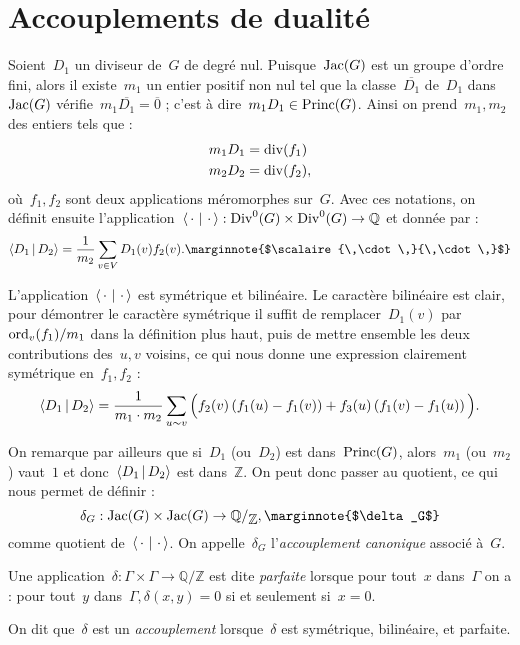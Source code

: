 \section{Accouplements de dualité}
	Soient~$D_1$ un diviseur de~$G$ de degré nul. Puisque~$\operatorname{Jac}(G)$ est un groupe d'ordre fini, alors il existe~$m_1$ un entier positif non nul tel que la classe~$\overline{D_1}$ de~$D_1$ dans~$\operatorname{Jac}(G)$ vérifie~$m_1 \overline{D_1}=\overline{0}$ ; c'est à dire~$m_1 D_1 \in \operatorname{Princ}(G)$. Ainsi on prend~$m_1, m_2$ des entiers tels que :
	\begin{align*}
		m_1 D_1 &= \operatorname{div}(f_1)\\
		m_2 D_2 &= \operatorname{div}(f_2),
	\end{align*}
	où~$f_1, f_2$ sont deux applications méromorphes sur~$G$. Avec ces notations, on définit ensuite l'application~$\left<\,\cdot\,\,|\,\,\cdot\,\right> :\operatorname{Div}^0(G)\times\operatorname{Div}^0(G) \rightarrow \mathbb{Q}$ et donnée par :
	\[
		\scalaire{D_1}{D_2} = \frac{1}{m_2} \sum_{v\in V}D_1(v) f_2(v).	\text{\marginnote{$\scalaire{\,\cdot\,}{\,\cdot\,}$}}
	\]
	\begin{rem}
		L'application~$\left<\,\cdot\,\,|\,\,\cdot\,\right>$ est symétrique et bilinéaire. Le caractère bilinéaire est clair, pour démontrer le caractère symétrique il suffit de remplacer~$D_1(v)$ par~$\operatorname{ord}_v(f_1)/m_1$ dans la définition plus haut, puis de mettre ensemble les deux contributions des~$u,v$ voisins, ce qui nous donne une expression clairement symétrique en~$f_1,f_2$ :
		\[
			\left<D_1\,|\,D_2\right> = \frac{1}{m_1 \cdot m_2}
			\sum_{u \sim v}\Big(
				f_2(v)\left(f_1(u) - f_1(v)\right)
				+
				f_3(u)\left(f_1(v)-f_1(u)\right)
			\Big).
		\]
	\end{rem}
	\begin{rem}
		On remarque par ailleurs que si~$D_1$ (ou~$D_2$) est dans~$\operatorname{Princ}(G)$, alors~$m_1$ (ou~$m_2$) vaut~$1$ et donc~$\left<D_1\,|\,D_2\right>$ est dans~$\mathbb{Z}$. On peut donc passer au quotient, ce qui nous permet de définir :
		\[
			\delta_G : \Jac(G)\times\Jac(G) \rightarrow \quotient{\mathbb{Q}}{\mathbb{Z}}, \text{\marginnote{$\delta_G$}}
		\]
		comme quotient de~$\left<\,\cdot\,\,|\,\,\cdot\,\right>$. On appelle~$\delta_G$ l'\emph{accouplement canonique} associé à~$G$.
	\end{rem}
	\begin{defi}
		Une application~$\delta : \Gamma\times\Gamma \rightarrow \mathbb{Q}/\mathbb{Z}$ est dite \emph{parfaite}  lorsque pour tout~$x$ dans~$\Gamma$ on a : pour tout~$y$ dans~$\Gamma, \delta(x,y) = 0$ si et seulement si~$x = 0$.
		
		On dit que~$\delta$ est un \emph{accouplement}  lorsque~$\delta$ est symétrique, bilinéaire, et parfaite.
	\end{defi}
